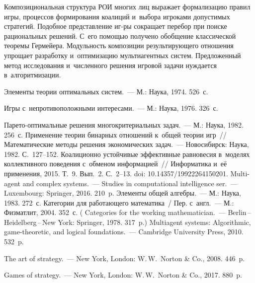 \begin{multicols}{2}
    Композициональная структура РОИ многих лиц 
выражает формализацию правил игры, процессов формирования коалиций и~выбора 
игроками до\-пус\-ти\-мых стратегий. Подобное представление иг-\linebreak ры сокращает перебор 
при поиске рациональных решений. С~его по\-мощью получено обобщение 
классической тео\-ре\-мы Гермейера. Мо\-дуль\-ность композиции ре\-зуль\-ти\-ру\-юще\-го 
отношения упро\-щает разработку и~оптимизацию муль\-ти\-агент\-ных сис\-тем. 
Пред\-ло\-жен\-ный метод исследования и~чис\-лен\-но\-го решения игровой задачи 
нуж\-да\-ет\-ся в~алгоритмизации. 
    
{\small\frenchspacing
 {%
 \begin{thebibliography}{99}

 Элементы теории оптимальных сис\-тем.~--- М.: Наука, 1974. 
526~с.

 Игры с~непротивоположными интересами.~--- М.: Наука, 1976. 
326~с.

 Па\-ре\-то-оп\-ти\-маль\-ные решения 
многокритериальных задач.~--- М.: Наука, 1982. 256~с.
 Применение тео\-рии бинарных отношений к~об\-щей тео\-рии игр~// 
Математические методы решения экономических задач.~--- Новосибирск: Наука, 1982. С.~127--152.
 Коалиционно устойчивые эффективные равновесия в~моделях 
коллективного поведения с~обменом информацией~// Информатика и~её 
применения, 2015. Т.~9. Вып.~2. С.~2--13. doi: 10.14357/19922264150201.
 Multi-agent and complex systems.~--- Studies in 
computational intelligence ser.~--- Luxembourg: Springer, 2016. 210~p.
 Элементы общей ал\-геб\-ры.~--- М.: Наука, 1983. 272~с.
 Категории для ра\-бо\-та\-юще\-го математика~/
Пер. с~англ.~--- М.: Физматлит, 2004.  352~с.
( Categories for the working mathematician.~---  
Berlin\,--\,Heidelberg\,--\,New York: Springer, 1978. 317~p.)
 Multiagent systems: Algorithmic, game-theoretic, and 
logical foundations.~--- Cambridge University Press, 2010. 532~p.

 The art of strategy.~--- New York, London: 
W.\,W.~Norton \& Co., 2008. 446~p.

 Games of strategy.~--- New York, 
London: W.\,W.~Norton \& Co., 2017. 880~p.

\end{thebibliography}

 }
 }

\end{multicols}

